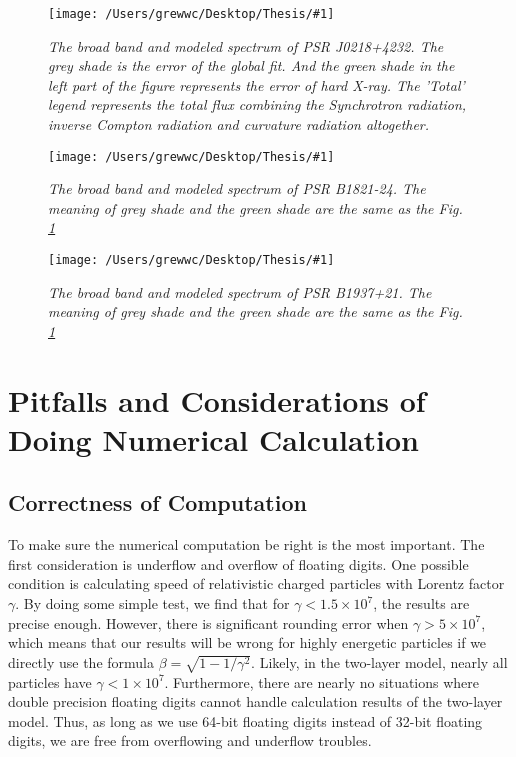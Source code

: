 \documentclass[12pt]{report}
\newcommand{\mycaption}[1]{\caption{\textit{\footnotesize #1}}}
\newcommand{\singleFig}[3]{
 \begin{figure}[!ht]
  \centering
  \texttt{[image: /Users/grewwc/Desktop/Thesis/\#1]}
  \mycaption{#3}
 \label{fig: #1}
 \end{figure}
}
\begin{document}
        \singleFig{j0218_twolayer_all.png}{0.39}{The broad band and modeled spectrum of PSR J0218+4232.
          The grey shade is the error of the global fit. And the green shade in the left part of the 
          figure represents the error of hard X-ray. The 'Total' legend represents the total flux 
          combining the Synchrotron radiation, inverse Compton radiation and curvature radiation
          altogether.}
        \vspace{0.5cm} 
        
        \singleFig{b1821_twolayer_all.png}{0.4}{The broad band and modeled spectrum of PSR B1821-24.
          The meaning of grey shade and the green shade are the same as the Fig.
          \ref{fig: j0218_twolayer_all.png}}
        \vspace{0.5cm} 
          
        \singleFig{j1939_twolayer_all.png}{0.39}{The broad band and modeled spectrum of PSR B1937+21.
          The meaning of grey shade and the green shade are the same as the Fig.
          \ref{fig: j0218_twolayer_all.png}}
        \vspace{0.5cm}
        
      \section{Pitfalls and Considerations of Doing Numerical Calculation}
        \subsection{Correctness of Computation}
          To make sure the numerical computation be right is the most important. 
          The first consideration is underflow and overflow of floating digits.
          One possible condition is calculating speed of relativistic charged particles with 
          Lorentz factor $\gamma$. By doing some simple test, we find that for 
          $\gamma < 1.5\times 10^7$, the results are precise enough. However, there is significant rounding error
          when $\gamma > 5\times 10^7$, which means that our results will be wrong for highly 
          energetic particles if we directly use the formula $\beta = \sqrt{1 - 1/\gamma^2}$.
          Likely, in the two-layer model, nearly all particles have $\gamma < 1\times 10^7$. 
          Furthermore, there are nearly no situations where double precision floating digits
          cannot handle calculation results of the two-layer model. Thus, as long as we use 
          64-bit floating digits instead of 32-bit floating digits, we are free from overflowing and 
          underflow troubles. 
            
\end{document}
